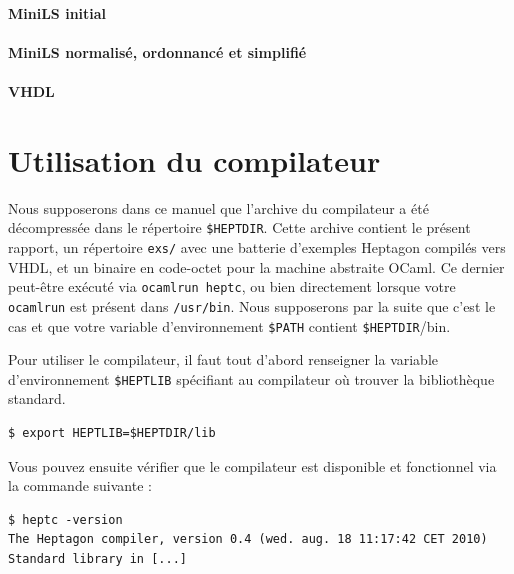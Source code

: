 \documentclass[a4paper]{article}
\newcommand{\LANG}{{\sc Heptagon}}
\begin{document}
\paragraph{MiniLS initial}

\small

\normalsize

\paragraph{MiniLS normalis\'e, ordonnanc\'e et simplifi\'e}

\small

\normalsize

\paragraph{VHDL}

\small

\normalsize

\section{Utilisation du compilateur}

Nous supposerons dans ce manuel que l'archive du compilateur a \'et\'e
d\'ecompress\'ee dans le r\'epertoire \verb/$HEPTDIR/. Cette archive contient le
pr\'esent rapport, un r\'epertoire \texttt{exs/} avec une batterie d'exemples
\LANG{} compil\'es vers VHDL, et un binaire en code-octet pour la machine
abstraite OCaml. Ce dernier peut-\^etre ex\'ecut\'e via \texttt{ocamlrun heptc},
ou bien directement lorsque votre \texttt{ocamlrun} est pr\'esent dans
\texttt{/usr/bin}. Nous supposerons par la suite que c'est le cas et que votre
variable d'environnement \verb/$PATH/ contient \verb/$HEPTDIR//bin.

Pour utiliser le compilateur, il faut tout d'abord renseigner la variable
d'environnement \verb/$HEPTLIB/ sp\'ecifiant au compilateur o\`u trouver la
biblioth\`eque standard.

\begin{verbatim}
$ export HEPTLIB=$HEPTDIR/lib
\end{verbatim}

Vous pouvez ensuite v\'erifier que le compilateur est disponible et fonctionnel
via la commande suivante :

\begin{verbatim}
$ heptc -version
The Heptagon compiler, version 0.4 (wed. aug. 18 11:17:42 CET 2010)
Standard library in [...]
\end{verbatim}
\end{document}
